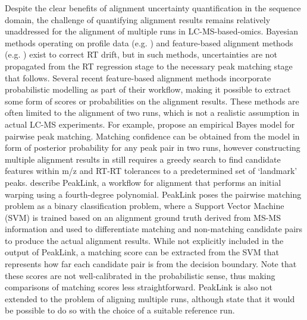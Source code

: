 Despite the clear benefits of alignment uncertainty quantification in the sequence domain, the challenge of quantifying alignment results remains relatively unaddressed for the alignment of multiple runs in LC-MS-based-omics. Bayesian methods operating on profile data (e.g. \cite{Listgarten2004, Kong2009, Tsai2013a}) and feature-based alignment methods (e.g. \cite{Fischer2006, Pluskal2010, Voss2011a}) exist to correct RT drift, but in such methods, uncertainties are not propagated from the RT regression stage to the necessary peak matching stage that follows. Several recent feature-based alignment methods incorporate probabilistic modelling as part of their workflow, making it possible to extract some form of scores or probabilities on the alignment results. These methods are often limited to the alignment of two runs, which is not a realistic assumption in actual LC-MS experiments. For example, \cite{Jeong2012} propose an empirical Bayes model for pairwise peak matching. Matching confidence can be obtained from the model in form of posterior probability for any peak pair in two runs, however constructing multiple alignment results in \cite{Jeong2012} still requires a greedy search to find candidate features within m/z and RT-RT tolerances to a predetermined set of `landmark' peaks. \cite{GhanatBari2014b} describe PeakLink, a workflow for alignment that performs an initial warping using a fourth-degree polynomial. PeakLink poses the pairwise matching problem as a binary classification problem, where a Support Vector Machine (SVM) is trained based on an alignment ground truth derived from MS-MS information and used to differentiate matching and non-matching candidate pairs to produce the actual alignment results. While not explicitly included in the output of PeakLink, a matching score can be extracted from the SVM that represents how far each candidate pair is from the decision boundary. Note that these scores are not well-calibrated in the probabilistic sense, thus making comparisons of matching scores less straightforward. PeakLink is also not extended to the problem of aligning multiple runs, although \cite{GhanatBari2014b} state that it would be possible to do so with the choice of a suitable reference run.

